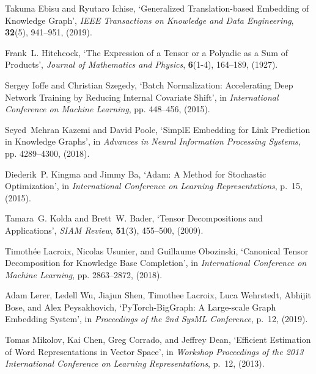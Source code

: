 \documentclass{ecai}
\theoremstyle{plain}  \newtheorem{thm}{Theorem}  \newtheorem{lem}[thm]{Lemma}  \newtheorem{prop}[thm]{Proposition}
\theoremstyle{remark}  \newtheorem*{rem}{Remark}
\begin{document}
\begin{thebibliography}{10}
Takuma Ebisu and Ryutaro Ichise, `Generalized {{Translation-based Embedding}}
  of {{Knowledge Graph}}', {\em IEEE Transactions on Knowledge and Data
  Engineering}, {\bf 32}(5),  941--951, (2019).

Frank~L. Hitchcock, `The {{Expression}} of a {{Tensor}} or a {{Polyadic}} as a
  {{Sum}} of {{Products}}', {\em Journal of Mathematics and Physics}, {\bf
  6}(1-4),  164--189, (1927).

Sergey Ioffe and Christian Szegedy, `Batch {{Normalization}}: {{Accelerating
  Deep Network Training}} by {{Reducing Internal Covariate Shift}}', in {\em
  International {{Conference}} on {{Machine Learning}}}, pp. 448--456, (2015).

Seyed~Mehran Kazemi and David Poole, `{{SimplE Embedding}} for {{Link
  Prediction}} in {{Knowledge Graphs}}', in {\em Advances in {{Neural
  Information Processing Systems}}}, pp. 4289--4300, (2018).

Diederik~P. Kingma and Jimmy Ba, `Adam: {{A Method}} for {{Stochastic
  Optimization}}', in {\em International {{Conference}} on {{Learning
  Representations}}}, p.~15, (2015).

Tamara~G. Kolda and Brett~W. Bader, `Tensor {{Decompositions}} and
  {{Applications}}', {\em SIAM Review}, {\bf 51}(3),  455--500, (2009).

Timoth{\'e}e Lacroix, Nicolas Usunier, and Guillaume Obozinski, `Canonical
  {{Tensor Decomposition}} for {{Knowledge Base Completion}}', in {\em
  International {{Conference}} on {{Machine Learning}}}, pp. 2863--2872,
  (2018).

Adam Lerer, Ledell Wu, Jiajun Shen, Timothee Lacroix, Luca Wehrstedt, Abhijit
  Bose, and Alex Peysakhovich, `{{PyTorch-BigGraph}}: {{A Large-scale Graph
  Embedding System}}', in {\em Proceedings of the 2nd {{SysML Conference}}},
  p.~12, (2019).

Tomas Mikolov, Kai Chen, Greg Corrado, and Jeffrey Dean, `Efficient
  {{Estimation}} of {{Word Representations}} in {{Vector Space}}', in {\em
  Workshop {{Proceedings}} of the 2013 {{International Conference}} on
  {{Learning Representations}}}, p.~12, (2013).


\end{thebibliography}
\end{document}
